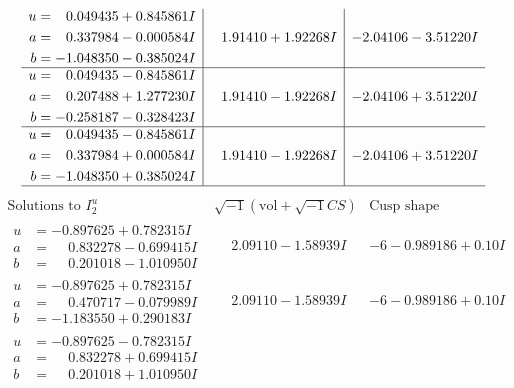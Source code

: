 \documentclass[1p]{elsarticle_modified}
\theoremstyle{definition}
\newcommand{\I}{\sqrt{-1}}
\begin{document}
$$\begin{array}{c|c|c}
\begin{aligned}
u &= \phantom{-}0.049435 + 0.845861 I \\
a &= \phantom{-}0.337984 - 0.000584 I \\
b &= -1.048350 - 0.385024 I\end{aligned}
 & \phantom{-}1.91410 + 1.92268 I & -2.04106 - 3.51220 I \\ \hline\begin{aligned}
u &= \phantom{-}0.049435 - 0.845861 I \\
a &= \phantom{-}0.207488 + 1.277230 I \\
b &= -0.258187 - 0.328423 I\end{aligned}
 & \phantom{-}1.91410 - 1.92268 I & -2.04106 + 3.51220 I \\ \hline\begin{aligned}
u &= \phantom{-}0.049435 - 0.845861 I \\
a &= \phantom{-}0.337984 + 0.000584 I \\
b &= -1.048350 + 0.385024 I\end{aligned}
 & \phantom{-}1.91410 - 1.92268 I & -2.04106 + 3.51220 I\\
 \hline 
 \end{array}$$\newpage$$\begin{array}{c|c|c}  
\text{Solutions to }I^u_{2}& \I (\text{vol} + \sqrt{-1}CS) & \text{Cusp shape}\\
 \hline 
\begin{aligned}
u &= -0.897625 + 0.782315 I \\
a &= \phantom{-}0.832278 - 0.699415 I \\
b &= \phantom{-}0.201018 - 1.010950 I\end{aligned}
 & \phantom{-}2.09110 - 1.58939 I &                  -6
-0.989186 + 0. 10   I\phantom{ +0.000000I} \\ \hline\begin{aligned}
u &= -0.897625 + 0.782315 I \\
a &= \phantom{-}0.470717 - 0.079989 I \\
b &= -1.183550 + 0.290183 I\end{aligned}
 & \phantom{-}2.09110 - 1.58939 I &                  -6
-0.989186 + 0. 10   I\phantom{ +0.000000I} \\ \hline\begin{aligned}
u &= -0.897625 - 0.782315 I \\
a &= \phantom{-}0.832278 + 0.699415 I \\
b &= \phantom{-}0.201018 + 1.010950 I\end{aligned}

\end{array}$$
\end{document}
